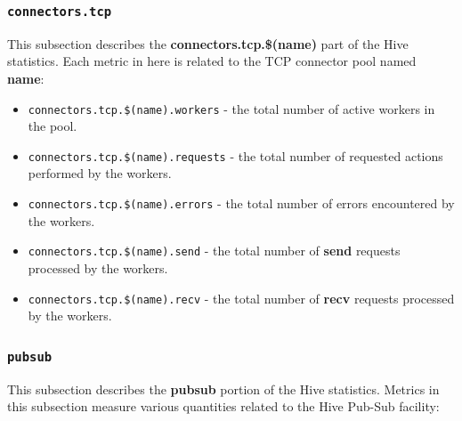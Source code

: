 \documentclass[a4paper]{article}
\begin{document}
\subsubsection{\texttt{connectors.tcp}}
\label{sec-4-2-14}

This subsection describes the \textbf{connectors.tcp.\$(name)} part of the Hive statistics. Each metric in here is related to the TCP connector pool named \textbf{name}:


\begin{itemize}
\item \texttt{connectors.tcp.\$(name).workers} - the total number of active workers in the pool.
\item \texttt{connectors.tcp.\$(name).requests} - the total number of requested actions performed by the workers.
\item \texttt{connectors.tcp.\$(name).errors} - the total number of errors encountered by the workers.
\item \texttt{connectors.tcp.\$(name).send} - the total number of \textbf{send} requests processed by the workers.
\item \texttt{connectors.tcp.\$(name).recv} - the total number of \textbf{recv} requests processed by the workers.
\end{itemize}
\subsubsection{\texttt{pubsub}}
\label{sec-4-2-15}

This subsection describes the \textbf{pubsub} portion of the Hive statistics. Metrics in this subsection measure various quantities related to the Hive Pub-Sub facility:
\end{document}

